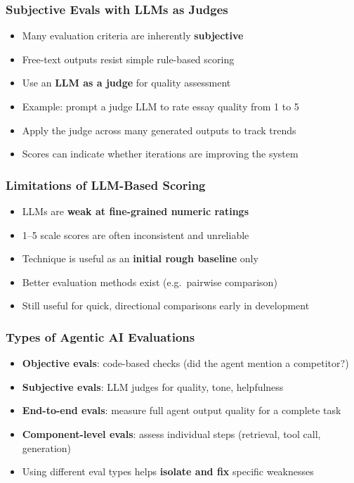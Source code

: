 \begin{frame}[fragile]\frametitle{Subjective Evals with LLMs as Judges}
      \begin{itemize}
        \item Many evaluation criteria are inherently \textbf{subjective}
        \item Free-text outputs resist simple rule-based scoring
        \item Use an \textbf{LLM as a judge} for quality assessment
        \item Example: prompt a judge LLM to rate essay quality from 1 to 5
        \item Apply the judge across many generated outputs to track trends
        \item Scores can indicate whether iterations are improving the system
      \end{itemize}
\end{frame}

\begin{frame}[fragile]\frametitle{Limitations of LLM-Based Scoring}
      \begin{itemize}
        \item LLMs are \textbf{weak at fine-grained numeric ratings}
        \item 1--5 scale scores are often inconsistent and unreliable
        \item Technique is useful as an \textbf{initial rough baseline} only
        \item Better evaluation methods exist (e.g.\ pairwise comparison)
        \item Still useful for quick, directional comparisons early in development
      \end{itemize}
\end{frame}

\begin{frame}[fragile]\frametitle{Types of Agentic AI Evaluations}
      \begin{itemize}
        \item \textbf{Objective evals}: code-based checks (did the agent mention a competitor?)
        \item \textbf{Subjective evals}: LLM judges for quality, tone, helpfulness
        \item \textbf{End-to-end evals}: measure full agent output quality for a complete task
        \item \textbf{Component-level evals}: assess individual steps (retrieval, tool call, generation)
        \item Using different eval types helps \textbf{isolate and fix} specific weaknesses
      \end{itemize}
\end{frame}

